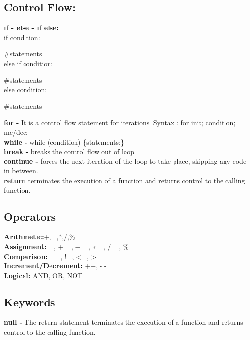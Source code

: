 \documentclass[11pt]{article}
\begin{document}
\subsection{Control Flow:}

\quad\qquad \textbf {if - else - if else: } \\

\qquad\qquad if condition:

\qquad\qquad\qquad \#statements\\

\qquad\qquad else if condition:

\qquad\qquad\qquad \#statements\\

\qquad\qquad else condition:

\qquad\qquad\qquad \#statements

\qquad \textbf{for -} It is a control flow statement for iterations. Syntax :  for init; condition; inc/dec: \\

\qquad \textbf{while -} while (condition) \{statements;\}\\

\qquad \textbf{break -} breaks the control flow out of loop \\

\qquad \textbf{continue -} forces the next iteration of the loop to take place, skipping any code in between. \\

\qquad \textbf{return} terminates the execution of a function and returns control to the calling function.

\subsection{Operators}

\qquad \qquad \textbf{Arithmetic:}+,=,*,/,\%\\

\qquad \textbf{Assignment:} =, + =, − =, ∗ =, / =, \% =\\

\qquad \textbf{Comparison:} ==, !=, <=, >= \\

\qquad \textbf{Increment/Decrement:} ++, - - \\

\qquad \textbf{Logical:} AND, OR, NOT

\subsection{ Keywords}
\qquad \qquad \textbf {null -} The return statement terminates the execution of a function and returns control to the calling function.\\
\end{document}

